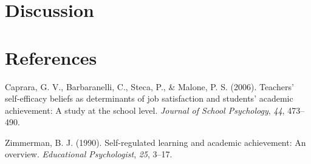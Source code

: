 \documentclass[man,floatsintext]{apa6}
\begin{document}
\newpage

\section{Discussion}\label{discussion}

\newpage

\section{References}\label{references}

\begingroup
\setlength{\parindent}{-0.5in} \setlength{\leftskip}{0.5in}

\hypertarget{refs}{}
\hypertarget{ref-caprara2006teachers}{}
Caprara, G. V., Barbaranelli, C., Steca, P., \& Malone, P. S. (2006).
Teachers' self-efficacy beliefs as determinants of job satisfaction and
students' academic achievement: A study at the school level.
\emph{Journal of School Psychology}, \emph{44}, 473--490.

\hypertarget{ref-zimmerman1990self}{}
Zimmerman, B. J. (1990). Self-regulated learning and academic
achievement: An overview. \emph{Educational Psychologist}, \emph{25},
3--17.

\endgroup
\end{document}
